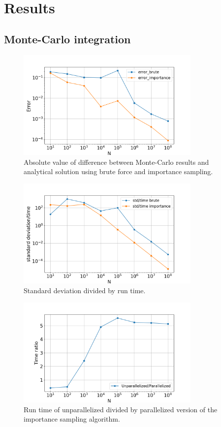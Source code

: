 \section{Results}


\subsection{Monte-Carlo integration}


\begin{figure}[H]
  \centering
  \includegraphics[width=0.8\textwidth]{../figures/mc_error.png}
  \caption{Absolute value of difference between Monte-Carlo results and analytical
  solution using brute force and importance sampling.}

  \label{fig:mc_error}
\end{figure}


\begin{figure}[H]
  \centering
  \includegraphics[width=0.8\textwidth]{../figures/mc_std_time.png}
  \caption{Standard deviation divided by run time.}

  \label{fig:mc_std_time}
\end{figure}


\begin{figure}[H]
  \centering
  \includegraphics[width=0.8\textwidth]{../figures/mc_time_ratio.png}
  \caption{Run time of unparallelized divided by parallelized version
          of the importance sampling algorithm.}

  \label{fig:mc_time_ratio}
\end{figure}
